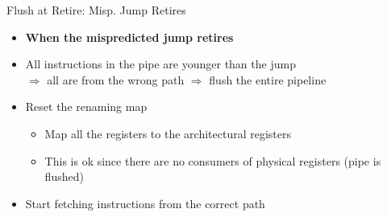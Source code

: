 \documentclass[aspectratio=169,12pt]{beamer}
\begin{document}
\begin{frame}{Flush at Retire: Misp. Jump Retires}
    \vspace{1cm}
    \centering
    
    
    \begin{itemize}
        \item[]\textbf{When the mispredicted jump retires}
        \item All instructions in the pipe are younger than the jump \\
        $\Rightarrow$ all are from the wrong path $\Rightarrow$ flush the entire pipeline
        \item Reset the renaming map
        \begin{itemize}
            \item Map all the registers to the architectural registers
            \item This is ok since there are no consumers of physical registers (pipe is flushed)
        \end{itemize}
        \item Start fetching instructions from the correct path
    \end{itemize}
\end{frame}
\end{document}
